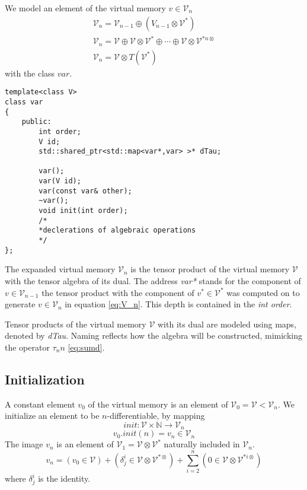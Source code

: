 \documentclass{article}
\newcommand{\VV}{\mathcal{V}}
\newcommand{\sumd}{\tau}
\begin{document}
We model an element of the virtual memory $v\in\VV_n$ 
\begin{eqnarray}
\VV_{n}=\VV_{n-1}\oplus(V_{n-1}\otimes\VV^*) \\
\VV_{n}=\VV\oplus\VV\otimes\VV^*\oplus\cdots\oplus\VV\otimes\VV^{*n\otimes}\\ \label{eq:V_n}
\VV_n=\VV\otimes T(\VV^*)
\end{eqnarray}
with the class $var$.

\begin{lstlisting}
template<class V>
class var
{
    public:
    	int order;
        V id;
        std::shared_ptr<std::map<var*,var> >* dTau;

        var();
        var(V id);
        var(const var& other);
        ~var();
        void init(int order);
        /*
        *declerations of algebraic operations
        */
};
\end{lstlisting}

The expanded virtual memory $\VV_n$ is the tensor product of the virtual memory $\VV$ with the tensor algebra of its dual. The address \emph{var*} stands for the component of $v\in\VV_{n-1}$ the tensor product with the component of $v^*\in\VV^*$ was computed on to generate $v\in\VV_n$ in equation \eqref{eq:V_n}. This depth is contained in the \emph{int order}.

Tensor products of the virtual memory $\VV$ with its dual are modeled using maps, denoted by \emph{dTau}. Naming reflects how the algebra will be constructed, mimicking the operator $\sumd_nn$ \eqref{eq:sumd}.

\subsection{Initialization}

A constant element $v_0$ of the virtual memory is an element of $\VV_0=\VV<\VV_n$. We initialize an element to be $n$-differentiable, by mapping
\begin{equation}
init:\VV\times\mathbb{N}\to\VV_n
\end{equation}
\begin{equation}
v_0.init(n)=v_n\in\VV_n
\end{equation}
The image $v_n$ is an element of $\VV_1=\VV\otimes\VV^*$ naturally included in $\VV_n$.
\begin{equation}
v_n=(v_0\in\VV)+(\delta^i_j\in\VV\otimes\VV^ {*\otimes})+\sum\limits_{i=2}^n(0\in\VV\otimes\VV^ {*i\otimes})
\end{equation}
where $\delta^i_j$ is the identity.
\end{document}
